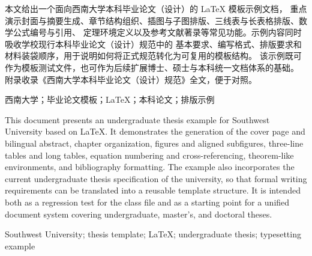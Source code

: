 




\frontmatter
\maketitle
\tableofcontents
\begin{cnabstract}
本文给出一个面向西南大学本科毕业论文（设计）的 \LaTeX{} 模板示例文档，
重点演示封面与摘要生成、章节结构组织、插图与子图排版、三线表与长表格排版、数学公式编号与引用、
定理环境定义以及参考文献著录等常见功能。示例内容同时吸收学校现行本科毕业论文（设计）规范中的
基本要求、编写格式、排版要求和材料装袋顺序，用于说明如何将正式规范转化为可复用的模板结构。
该示例既可作为模板测试文件，也可作为后续扩展博士、硕士与本科统一文档体系的基础。
附录收录《西南大学本科毕业论文（设计）规范》全文，便于对照。
\end{cnabstract}
\begin{cnkeywords}
西南大学；毕业论文模板；\LaTeX；本科论文；排版示例
\end{cnkeywords}
\begin{enabstract}
This document presents an undergraduate thesis example for Southwest University %
based on \LaTeX. %
It demonstrates the generation of the cover page and bilingual abstract, %
chapter organization, figures and aligned subfigures, %
three-line tables and long tables, %
equation numbering and cross-referencing, %
theorem-like environments, and bibliography formatting.%
The example also incorporates the current undergraduate thesis specification %
of the university, %
so that formal writing requirements can be translated %
into a reusable template structure. %
It is intended both as a regression test for the class file %
and as a starting point for a unified %
document system covering undergraduate, master's, and doctoral theses.
\end{enabstract}
\begin{enkeywords}
Southwest University; thesis template; \LaTeX; undergraduate thesis;%
typesetting example
\end{enkeywords}
\makeabstract

